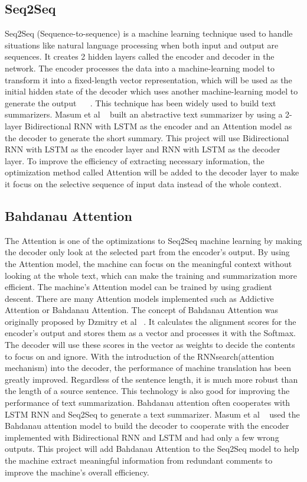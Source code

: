 \documentclass[conference]{IEEEtran}
\begin{document}
\subsection{Seq2Seq}
Seq2Seq (Sequence-to-sequence) is a machine learning technique used to handle situations like natural language processing when both input and output are sequences. It creates 2 hidden layers called the encoder and decoder in the network. The encoder processes the data into a machine-learning model to transform it into a fixed-length vector representation, which will be used as the initial hidden state of the decoder which uses another machine-learning model to generate the output ~\cite{sutskever2014sequence} ~\cite{vinyals2015show}. This technique has been widely used to build text summarizers. Masum et al ~\cite{Masum2019} built an abstractive text summarizer by using a 2-layer Bidirectional RNN with LSTM as the encoder and an Attention model as the decoder to generate the short summary. This project will use Bidirectional RNN with LSTM as the encoder layer and RNN with LSTM as the decoder layer. To improve the efficiency of extracting necessary information, the optimization method called Attention will be added to the decoder layer to make it focus on the selective sequence of input data instead of the whole context.
\subsection{Bahdanau Attention}
The Attention is one of the optimizations to Seq2Seq machine learning by making the decoder only look at the selected part from the encoder’s output. By using the Attention model, the machine can focus on the meaningful context without looking at the whole text, which can make the training and summarization more efficient. The machine’s Attention model can be trained by using gradient descent. There are many Attention models implemented such as Addictive Attention or Bahdanau Attention. The concept of Bahdanau Attention was originally proposed by Dzmitry et al ~\cite{bahdanau2014neural}. It calculates the alignment scores for the encoder’s output and stores them as a vector and processes it with the Softmax. The decoder will use these scores in the vector as weights to decide the contents to focus on and ignore. With the introduction of the RNNsearch(attention mechanism) into the decoder, the performance of machine translation has been greatly improved. Regardless of the sentence length, it is much more robust than the length of a source sentence. This technology is also good for improving the performance of text summarization. Bahdanau attention often cooperates with LSTM RNN and Seq2Seq to generate a text summarizer. Masum et al ~\cite{Masum2019} used the Bahdanau attention model to build the decoder to cooperate with the encoder implemented with Bidirectional RNN and LSTM and had only a few wrong outputs. This project will add Bahdanau Attention to the Seq2Seq model to help the machine extract meaningful information from redundant comments to improve the machine’s overall efficiency.
\end{document}
